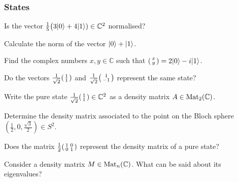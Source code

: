 \documentclass[a4paper, oneside, 12pt]{amsart}
\begin{document}
\subsubsection*{States}
\begin{thmlist}
  \item  Is the vector \( \tfrac{1}{5} \big(3\lvert0\rangle + 4\lvert1\rangle) \in \mathbb{C}^{2}\) normalised?
  \item Calculate the norm of the vector \(\lvert0\rangle + \lvert1\rangle\).
  \item Find the complex numbers \(x, y\in \mathbb{C}\) such that \(
  \begin{psmallmatrix}
    x \\ y
  \end{psmallmatrix} = 2\lvert0\rangle - i\lvert1\rangle\).
  \item Do the vectors \(
  \tfrac{1}{\sqrt{2}}
  \begin{psmallmatrix}
    1 \\1
  \end{psmallmatrix}
\) and \( \tfrac{1}{\sqrt{2}}
  \begin{psmallmatrix}
    1 \\-1
  \end{psmallmatrix}\)
  represent the same state?
  \item Write the pure state \(\tfrac{1}{\sqrt{2}}
  \begin{psmallmatrix}
    1 \\1
  \end{psmallmatrix} \in \mathbb{C}^{2}\) as a density matrix \(A \in \operatorname{Mat}_{2}( \mathbb{C})\).
  \item Determine the density matrix associated to the point on the Bloch sphere \((\tfrac{1}{2}, 0, \tfrac{\sqrt{3}}{2})\in S^{2}\).
  \item Does the matrix \(\tfrac{1}{2} \begin{psmallmatrix} 1 & 0 \\ 0 & 1 \end{psmallmatrix}\) represent the density matrix of a pure state?
  \item Consider a density matrix \(M \in \operatorname{Mat}_{n}( \mathbb{C})\). What can be said about its eigenvalues?
\end{thmlist}
\end{document}
